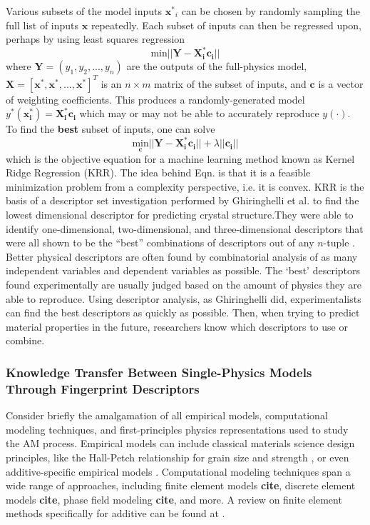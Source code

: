 Various subsets of the model inputs $\mathbf{x^*}_i$ can be chosen by randomly sampling the full list of inputs $\mathbf{x}$ repeatedly. Each subset of inputs can then be regressed upon, perhaps by using least squares regression
\begin{equation}
	\text{min} ||\mathbf{Y} - \mathbf{X^*_i} \mathbf{c_i}||
	\label{obj2}
\end{equation}
where $\mathbf{Y} = (y_1,y_2,...,y_n)$ are the outputs of the full-physics model, $\mathbf{X} = \left[ \mathbf{x^*} ,\mathbf{x^*},...,\mathbf{x^*}\right]^T$ is an $n \times m$ matrix of the subset of inputs, and $\mathbf{c}$ is a vector of weighting coefficients. This produces a randomly-generated model $y^*(\mathbf{x^*_i}) = \mathbf{X^*_i}\mathbf{c_i}$ which may or may not be able to accurately reproduce $y(\cdot)$. To find the \textbf{best} subset of inputs, one can solve 
\begin{equation}
	\underset{\mathbf{c}}{\text{min}}|| \mathbf{Y} - \mathbf{X^*_i} \mathbf{c_i}|| + \lambda||\mathbf{c_i}||
	\label{KRR}
\end{equation}
which is the objective equation for a machine learning method known as Kernel Ridge Regression (KRR). The idea behind Eqn. \label{KRR} is that it is a feasible minimization problem from a complexity perspective, i.e. it is convex. KRR is the basis of a descriptor set investigation performed by Ghiringhelli et al. to find the lowest dimensional descriptor for predicting crystal structure.They were able to identify one-dimensional, two-dimensional, and three-dimensional descriptors that were all shown to be the ``best'' combinations of descriptors out of any $n$-tuple \cite{Ghiringhelli2015}. Better physical descriptors are often found by combinatorial analysis of as many independent variables and dependent variables as possible. The `best' descriptors found experimentally are usually judged based on the amount of physics they are able to reproduce. Using descriptor analysis, as Ghiringhelli did, experimentalists can find the best descriptors as quickly as possible. Then, when trying to predict material properties in the future, researchers know which descriptors to use or combine.

\subsubsection{Knowledge Transfer Between Single-Physics Models Through Fingerprint Descriptors}
Consider briefly the amalgamation of all empirical models, computational modeling techniques, and first-principles physics representations used to study the AM process. Empirical models can include classical materials science design principles, like the Hall-Petch relationship for grain size and strength \cite{Martin2017}, or even additive-specific empirical models \cite{Gockel2013, Beuth2013}. Computational modeling techniques span a wide range of approaches, including finite element models \textbf{cite}, discrete element models \textbf{cite}, phase field modeling \textbf{cite}, and more. A review on finite element methods specifically for additive can be found at \cite{Gouge2018}.

